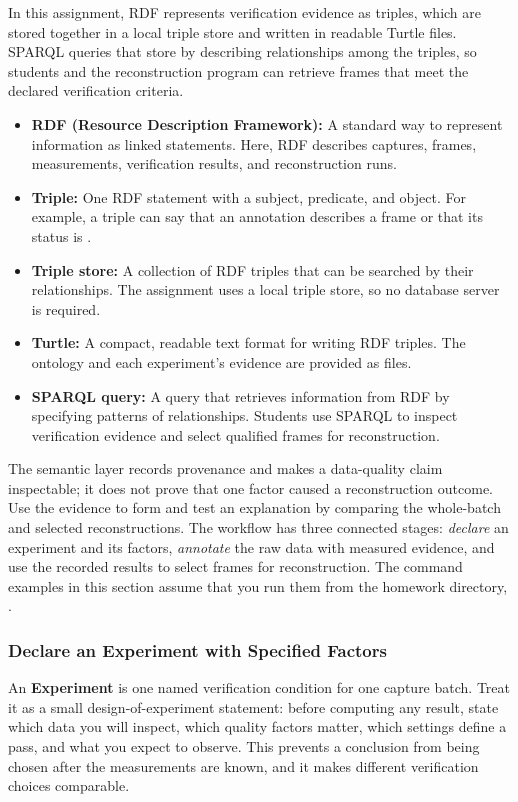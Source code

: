 \documentclass[11pt]{article}
\newcommand{\code}[1]{\texttt{\detokenize{#1}}}
\begin{document}
In this assignment, RDF represents verification evidence as triples, which are
stored together in a local triple store and written in readable Turtle files.
SPARQL queries that store by describing relationships among the triples, so
students and the reconstruction program can retrieve frames that meet the
declared verification criteria.

\begin{itemize}
\item \textbf{RDF (Resource Description Framework):} A standard way to
represent information as linked statements. Here, RDF describes captures,
frames, measurements, verification results, and reconstruction runs.
\item \textbf{Triple:} One RDF statement with a subject, predicate, and object.
For example, a triple can say that an annotation describes a frame or that its
status is \code{Pass}.
\item \textbf{Triple store:} A collection of RDF triples that can be searched
by their relationships. The assignment uses a local triple store, so no
database server is required.
\item \textbf{Turtle:} A compact, readable text format for writing RDF
triples. The ontology and each experiment's evidence are provided as
\code{.ttl} files.
\item \textbf{SPARQL query:} A query that retrieves information from RDF by
specifying patterns of relationships. Students use SPARQL to inspect
verification evidence and select qualified frames for reconstruction.
\end{itemize}

The semantic layer records provenance and makes a data-quality claim
inspectable; it does not prove that one factor caused a reconstruction outcome.
Use the evidence to form and test an explanation by comparing the whole-batch
and selected reconstructions. The workflow has three connected stages:
\emph{declare} an experiment and its factors, \emph{annotate} the raw data
with measured evidence, and use the recorded results to select frames for
reconstruction.
The command examples in this section assume that you run them from the homework
directory, \code{<repository-root>/hw1}.

\subsubsection{Declare an Experiment with Specified Factors}

An \textbf{Experiment} is one named verification condition for one capture
batch. Treat it as a small design-of-experiment statement: before computing
any result, state which data you will inspect, which quality factors matter,
which settings define a pass, and what you expect to observe. This prevents a
conclusion from being chosen after the measurements are known, and it makes
different verification choices comparable.
\end{document}
